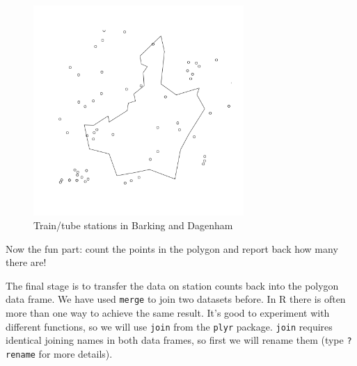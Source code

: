\documentclass[]{article}
\newenvironment{Shaded}{}{}
\newcommand{\KeywordTok}[1]{\textcolor[rgb]{0.00,0.44,0.13}{\textbf{{#1}}}}
\newcommand{\StringTok}[1]{\textcolor[rgb]{0.25,0.44,0.63}{{#1}}}
\newcommand{\NormalTok}[1]{{#1}}
\let\Oldincludegraphics\includegraphics
\renewcommand{\includegraphics}[1]{\Oldincludegraphics[width=8cm]{#1}}
\begin{document}
\begin{Shaded}
\end{Shaded}
\begin{figure}[htbp]
\centering
\includegraphics{figure/Train/tube_stations_in_Barking_and_Dagenham.png}
\caption{Train/tube stations in Barking and Dagenham}
\end{figure}

Now the fun part: count the points in the polygon and report back how
many there are!

The final stage is to transfer the data on station counts back into the
polygon data frame. We have used \texttt{merge} to join two datasets
before. In R there is often more than one way to achieve the same
result. It's good to experiment with different functions, so we will use
\texttt{join} from the \texttt{plyr} package. \texttt{join} requires
identical joining names in both data frames, so first we will rename
them (type \texttt{?rename} for more details).
\end{document}
